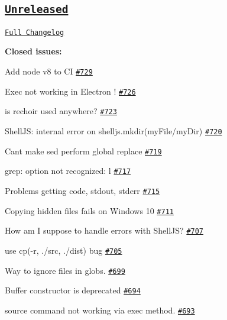 \subsection*{\href{https://github.com/shelljs/shelljs/tree/HEAD}{\tt Unreleased}}

\href{https://github.com/shelljs/shelljs/compare/v0.7.7...HEAD}{\tt Full Changelog}

{\bfseries Closed issues\+:}


\begin{DoxyItemize}
\item Add node v8 to CI \href{https://github.com/shelljs/shelljs/issues/729}{\tt \#729}
\item Exec not working in Electron ! \href{https://github.com/shelljs/shelljs/issues/726}{\tt \#726}
\item is rechoir used anywhere? \href{https://github.com/shelljs/shelljs/issues/723}{\tt \#723}
\item Shell\+JS\+: internal error on shelljs.\+mkdir(\textquotesingle{}my\+File/my\+Dir\textquotesingle{}) \href{https://github.com/shelljs/shelljs/issues/720}{\tt \#720}
\item Can\textquotesingle{}t make sed perform global replace \href{https://github.com/shelljs/shelljs/issues/719}{\tt \#719}
\item grep\+: option not recognized\+: l \href{https://github.com/shelljs/shelljs/issues/717}{\tt \#717}
\item Problems getting code, stdout, stderr \href{https://github.com/shelljs/shelljs/issues/715}{\tt \#715}
\item Copying hidden files fails on Windows 10 \href{https://github.com/shelljs/shelljs/issues/711}{\tt \#711}
\item How am I suppose to handle errors with Shell\+JS? \href{https://github.com/shelljs/shelljs/issues/707}{\tt \#707}
\item use cp(\textquotesingle{}-\/r\textquotesingle{}, \textquotesingle{}./src\textquotesingle{}, \textquotesingle{}./dist\textquotesingle{}) bug \href{https://github.com/shelljs/shelljs/issues/705}{\tt \#705}
\item Way to ignore files in globs. \href{https://github.com/shelljs/shelljs/issues/699}{\tt \#699}
\item Buffer constructor is deprecated \href{https://github.com/shelljs/shelljs/issues/694}{\tt \#694}
\item source command not working via exec method. \href{https://github.com/shelljs/shelljs/issues/693}{\tt \#693}

\end{DoxyItemize}
